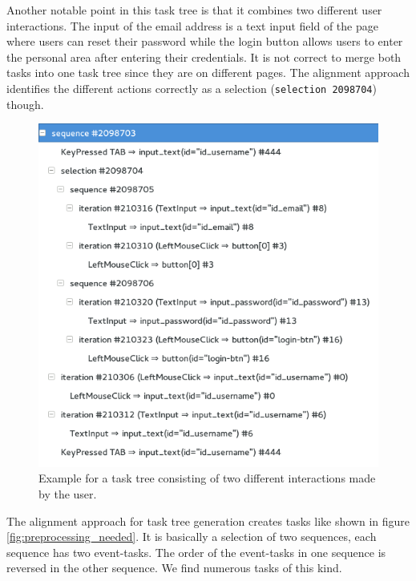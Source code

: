 Another notable point in this task tree is that it combines two different user interactions. 
The input of the email address is a text input field of the page where users can reset their password while the login button allows users to enter the personal area 
after entering their credentials. It is not correct to merge both tasks into one task tree since they are on different pages.
The alignment approach identifies the different actions correctly as a selection (\texttt{selection 2098704}) though. 

\begin{figure}[h]
	\centering
	\includegraphics[scale=0.75]{chapters/casestudy/mixedtasktree.png}
	\caption{Example for a task tree consisting of two different interactions made by the user.}
	\label{fig:mixedtasktree}
\end{figure}

The alignment approach for task tree generation creates tasks like shown in figure \ref{fig:preprocessing_needed}.
It is basically a selection of two sequences, each sequence has two event-tasks. 
The order of the event-tasks in one sequence is reversed in the other sequence.
We find numerous tasks of this kind.


